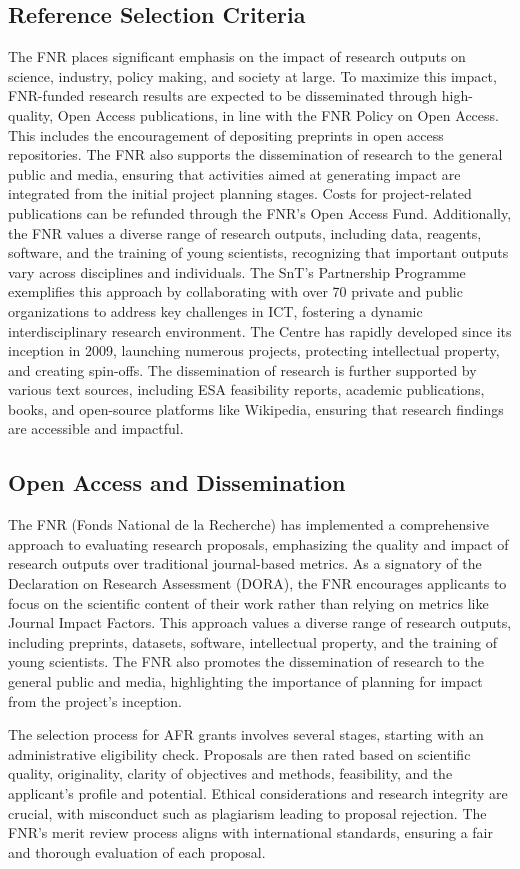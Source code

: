 \documentclass{article}
\begin{document}
\subsection{Reference Selection Criteria}

The FNR places significant emphasis on the impact of research outputs on science, industry, policy making, and society at large. To maximize this impact, FNR-funded research results are expected to be disseminated through high-quality, Open Access publications, in line with the FNR Policy on Open Access. This includes the encouragement of depositing preprints in open access repositories. The FNR also supports the dissemination of research to the general public and media, ensuring that activities aimed at generating impact are integrated from the initial project planning stages. Costs for project-related publications can be refunded through the FNR’s Open Access Fund. Additionally, the FNR values a diverse range of research outputs, including data, reagents, software, and the training of young scientists, recognizing that important outputs vary across disciplines and individuals. The SnT’s Partnership Programme exemplifies this approach by collaborating with over 70 private and public organizations to address key challenges in ICT, fostering a dynamic interdisciplinary research environment. The Centre has rapidly developed since its inception in 2009, launching numerous projects, protecting intellectual property, and creating spin-offs. The dissemination of research is further supported by various text sources, including ESA feasibility reports, academic publications, books, and open-source platforms like Wikipedia, ensuring that research findings are accessible and impactful.

\subsection{Open Access and Dissemination}

The FNR (Fonds National de la Recherche) has implemented a comprehensive approach to evaluating research proposals, emphasizing the quality and impact of research outputs over traditional journal-based metrics. As a signatory of the Declaration on Research Assessment (DORA), the FNR encourages applicants to focus on the scientific content of their work rather than relying on metrics like Journal Impact Factors. This approach values a diverse range of research outputs, including preprints, datasets, software, intellectual property, and the training of young scientists. The FNR also promotes the dissemination of research to the general public and media, highlighting the importance of planning for impact from the project's inception.

The selection process for AFR grants involves several stages, starting with an administrative eligibility check. Proposals are then rated based on scientific quality, originality, clarity of objectives and methods, feasibility, and the applicant's profile and potential. Ethical considerations and research integrity are crucial, with misconduct such as plagiarism leading to proposal rejection. The FNR's merit review process aligns with international standards, ensuring a fair and thorough evaluation of each proposal.
\end{document}
